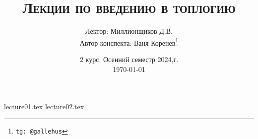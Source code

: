 \documentclass[a4paper]{article}
\title{\scshape {Лекции по введению в топлогию}}
\date{2 курс. Осенний семестр 2024,г. \\ \today}
\author{Лектор: Миллионщиков Д.В. \\ Автор конспекта: Ваня Коренев\thanks{\texttt{tg: @gallehus}}}
\begin{document}
\maketitle
\newpage
\tableofcontents

\newpage

{lecture01.tex}
{lecture02.tex}
\end{document}
